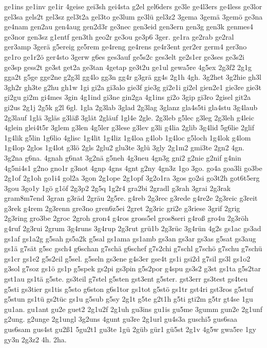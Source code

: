 {ge1ins
ge1inv
ge1ir
4geise
gei3sh
gei4sta
g2el
gel6ders
ge3le
ge4l3ers
ge4less
ge3lor
gel3sa
gels2t
gel3sz
gel3t2a
gel3to
ge3lum
ge3lü
gel3z2
3gema
3gemä
3gemö
ge3na
ge4nam
gen2au
gen4aug
gen2d3r
ge3nec
gen3eid
gen3ern
gen3g
gen3k
genmes4
ge3nor
gen3sz
g1entf
gen3th
geo2r
ge3ou
ge3p6
3ger.
ge1ra
ge2rab
ge2ral
ger3amp
3gerä
g5ereig
ge5rem
ge4reng
ge4rens
ge4r3ent
ger2er
germ4
ger3no
ge1ro
ge1r2ö
ger4sto
3gerw
g6es
ges3auf
ge5s2c
ges3elt
ge2s1er
ge3ses
ge3s2i
ge3sp
gess2t
ge3st
get2a
ge3tan
4getap
ge3t2u
ge1ul
gewa5re
4g5ex
2g3f2
2g1g
gga2t
g5ge
gge2ne
g2g3l
gg4lo
gg3n
gg4r
g3grä
gg4s
2g1h
4gh.
3g2het
3g2hie
gh3l
3gh2r
gh3te
g2hu
gh1w
1gi
gi2a
gi3alo
gie3f
gie3g
gi2e1i
gi2el
gien2e1
gie3re
gie3t
gi2gu
gi2m
gi4mes
3gin
4g1ind
gi3ne
gin2ga
4g1ins
gi2o
3gip
gi3ro
2gisel
git2a
gi2us
2g1j
2g5k
g2l
6gl.
1gla
2g3lab
3glad
2g3lag
3glanz
gla4s5ti
gla4stu
3g4laub
2g3lauf
1glä
3gläs
g3läß
3glät
2gläuf
1gl4e
2gle.
2g3leb
g5lec
g3leg
2g3leh
g4leic
4glein
glei4t5r
3glem
g3len
4g5ler
g3lese
g3lev
g3li
g4lia
2glib
3g4lid
5g6lie
2glif
1g4lik
g5lin
1g6lio
4glisc
1g4lit
1g4liz
1g4loa
g4lob
1g4loc
g5loch
1g4lok
g4lom
1g4lop
2glos
1g4lot
g3lö
2gls
2glu2
glu3te
3glü
3gly
2g1m2
gmi3te
2gn2
4gn.
3g2na
g6na.
4gnah
g6nat
3g2nä
g5neh
4g3neu
4gn3g
gni2
g2nie
g2nif
g4nin
4g5ni4s1
g2no
gno1r
g3not
4gnp
4gns
4gnt
g2ny
4gn3z
1go
3go.
go4a
goa3li
go3be
2g1of
2g1oh
go1i4
gol2a
3gon
2g1ope
2g1opf
3g2o1ra
3gos
go2si
go3t2h
got6t5erg
3gou
3go1y
1gö
g1öf
2g3p2
2g5q
1g2r4
gra2bi
2gradl
g3rah
3grai
2g3rak
gram8m7end
3gran
g3räd
2gräu
2g5re.
g4reb
2g3rec
g3rede
g4re2e
2g3reic
g3reit
g3rek
g4rem
2g3renn
gre3no
gren6z5ei
2gret
2g3ric
gri2e
g3riese
3grif
2grig
2g3ring
gro3be
2groc
2groh
gron4
g4ros
gross5el
gros8seri
g4roß
gro4u
2g3röh
g4ruf
2g3rui
2grum
3g4runs
3g4rup
2g3rut
grü1b
2g3rüc
3g4rün
4g2s
gs1ac
gs3ad
gs1af
gs1a2g
g5sah
gs5a2k
g5sal
gs1ama
gs1amb
gs3an
gs3ar
gs3as
g5sat
gs3aug
gs1ä
g7sät
g5sc
gsch4
g6schan
g7schä
g6schef
g7s2chi
g7schl
g7schö
g7schu
g7schü
gs1cr
gs1e2
g5s2eil
g5sel.
g5seln
gs3ene
g4s3er
gse4t
gs1i
gsi2d
g7sil
gs3l
gs1o2
g3sol
g7soz
gs1ö
gs1p
g5spek
gs2pi
gs3pin
g5s2por
g4spu
gs3s2
g3st
gs1ta
g5s2tar
gst1au
gs1tä
g5ste.
gs3teil
g7stel
g5sten
gst3ent
g5ster.
gst3err
gs3test
gs4teu
g5sti
gs3tier
gs1tis
g5sto
g6ston
g6s1tor
gs1tot
g5stö
gs1tr
gst4ri
gst3ros
g5stuf
g5stun
gs1tü
gs2tüc
gs1u
g5sub
g5sy
2g1t
g5te
g2t1h
g5ti
gti2m
g5tr
gt4se
1gu
gu1an.
gu1ant
gu2e
guet2
2g1u2f
2g1uh
gu3ins
gu1is
gu5me
3gumm
gun2e
2g1unf
g2ung.
g2unge
2g1ungl
3g2uns
4gunt
gu3re
2g1url
gu4s3a
guschi5
gus6saa
gus6sam
gus4st
gu2ß1
5gu2t1
gu3te
1gü
2güb
gür1
gü5st
2g1v
4g5w
gwa5re
1gy
gy3n
2g3z2
4h.
2ha.
}
